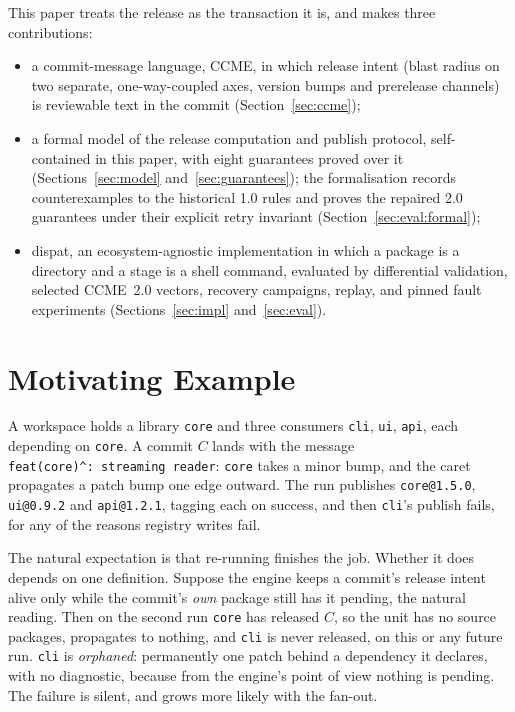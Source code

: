\documentclass[sigconf,nonacm]{acmart}
\newcommand{\code}[1]{\texttt{#1}}
\begin{document}
This paper treats the release as the transaction it is, and makes three
contributions:
\begin{itemize}
  \item a commit-message language, CCME, in which release intent
    (blast radius on two separate, one-way-coupled axes, version bumps and
    prerelease channels) is reviewable text in the commit
    (Section~\ref{sec:ccme});
  \item a formal model of the release computation and publish protocol,
    self-contained in this paper, with eight guarantees proved over it
    (Sections~\ref{sec:model} and~\ref{sec:guarantees}); the formalisation
    records counterexamples to the historical 1.0 rules and proves the
    repaired 2.0 guarantees under their explicit retry invariant
    (Section~\ref{sec:eval:formal});
  \item dispat, an ecosystem-agnostic implementation in which a package is
    a directory and a stage is a shell command, evaluated by differential
    validation, selected CCME~2.0 vectors, recovery campaigns, replay, and
    pinned fault experiments (Sections~\ref{sec:impl} and~\ref{sec:eval}).
\end{itemize}

\section{Motivating Example}
\label{sec:motivation}

A workspace holds a library \code{core} and three consumers \code{cli},
\code{ui}, \code{api}, each depending on \code{core}. A commit $C$ lands
with the message \code{feat(core)\^{}:~streaming reader}: \code{core}
takes a minor bump, and the caret propagates a patch bump one edge
outward. The run publishes \code{core@1.5.0}, \code{ui@0.9.2} and
\code{api@1.2.1}, tagging each on success, and then \code{cli}'s publish
fails, for any of the reasons registry writes fail.

The natural expectation is that re-running finishes the job. Whether it
does depends on one definition. Suppose the engine keeps a commit's
release intent alive only while the commit's \emph{own} package still has
it pending, the natural reading. Then on the second run \code{core}
has released $C$, so the unit has no source packages, propagates to
nothing, and \code{cli} is never released, on this or any future run.
\code{cli} is \emph{orphaned}: permanently one patch behind a dependency
it declares, with no diagnostic, because from the engine's point of view
nothing is pending. The failure is silent, and grows more likely with
the fan-out.
\end{document}
